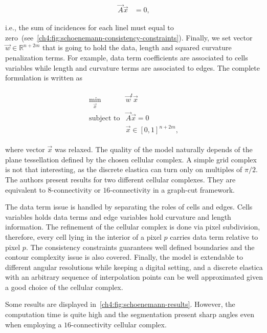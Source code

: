 \begin{align*}
	\vec{A}\vec{x} &=0,
\end{align*}

i.e., the sum of incidences for each linel must equal to zero~(see~\cref{ch4:fig:schoenemann-consistency-constraints}). Finally, we set vector $\vec{w} \in \mathbb{R}^{n+2m}$ that is going to hold the data, length and squared curvature penalization terms. For example, data term coefficients are associated to cells variables while length and curvature terms are associated to edges. The complete formulation is written as

\begin{align*}
	\begin{array}{rl}
		\min_{\vec{x}} & \vec{w}^t\vec{x}\\
		\text{subject to} & \vec{A}\vec{x} = 0 \\
		& \vec{x} \in [0,1]^{n+2m},
	\end{array}
\end{align*}


where vector $\vec{x}$ was relaxed. The quality of the model naturally depends of the plane tessellation defined by the chosen cellular complex. A simple grid complex is not that interesting, as the discrete elastica can turn only on multiples of $\pi/2$. The authors present results for two different cellular complexes. They are equivalent to $8$-connectivity or $16$-connectivity in a graph-cut framework. 

The data term issue is handled by separating the roles of cells and edges. Cells variables holds data terms and edge variables hold curvature and length information. The refinement of the cellular complex is done via pixel subdivision, therefore, every cell lying in the interior of a pixel $p$ carries data term relative to pixel $p$. The consistency constraints guarantees well defined boundaries and the contour complexity issue is also covered. Finally, the model is extendable to different angular resolutions while keeping a digital setting, and a discrete elastica with an arbitrary sequence of interpolation points can be well approximated given a good choice of the cellular complex.

Some results are displayed in~\cref{ch4:fig:schoenemann-results}. However, the computation time is quite high and the segmentation present sharp angles even when employing a $16$-connectivity cellular complex.

